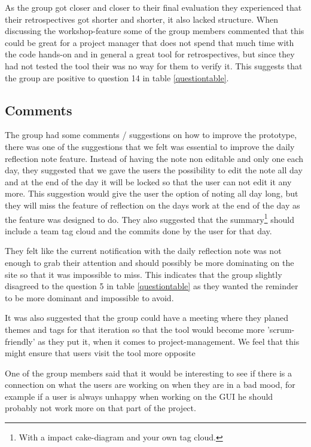 As the group got closer and closer to their final evaluation they experienced that their retrospectives got shorter and shorter, it also lacked structure. When discussing the workshop-feature some of the group members commented that this could be great for a project manager that does not spend that much time with the code hands-on and in general a great tool for retrospectives, but since they had not tested the tool their was no way for them to verify it. This suggests that the group are positive to question 14 in table \ref{questiontable}.

\subsection{Comments}
The group had some comments / suggestions on how to improve the prototype, there was one of the suggestions that we felt was essential to improve the daily reflection note feature. Instead of having the note non editable and only one each day, they suggested that we gave the users the possibility to edit the note all day and at the end of the day it will be locked so that the user can not edit it any more. This suggestion would give the user the option of noting all day long, but they will miss the feature of reflection on the days work at the end of the day as the feature was designed to do. They also suggested that the summary\footnote{With a impact cake-diagram and your own tag cloud.} should include a team tag cloud and the commits done by the user for that day.

They felt like the current notification with the daily reflection note was not enough to grab their attention and should possibly be more dominating on the site so that it was impossible to miss. This indicates that the group slightly disagreed to the question 5 in table \ref{questiontable} as they wanted the reminder to be more dominant and impossible to avoid.

It was also suggested that the group could have a meeting where they planed themes and tags for that iteration so that the tool would become more 'scrum-friendly' as they put it, when it comes to project-management. We feel that this might ensure that users visit the tool more opposite 

One of the group members said that it would be interesting to see if there is a connection on what the users are working on when they are in a bad mood, for example if a user is always unhappy when working on the GUI he should probably not work more on that part of the project.


